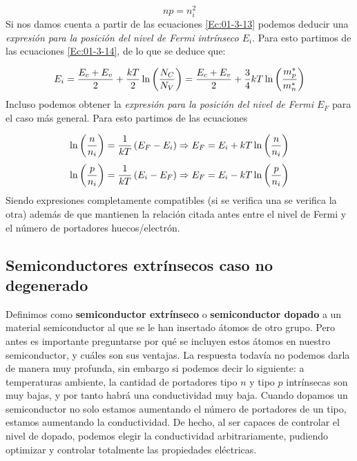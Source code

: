\begin{equation}
	np=n_i^2
\end{equation}
Si nos damos cuenta a partir de las ecuaciones \ref{Ec:01-3-13} podemos deducir una \textit{expresión para la posición del nivel de Fermi intrínseco $E_i$}. Para esto partimos de las ecuaciones \ref{Ec:01-3-14}, de lo que se deduce que:

\begin{equation}
	E_i = \frac{E_c+E_v}{2} + \frac{kT}{2} \ln \left( \frac{N_C}{N_V} \right) = \frac{E_c+E_v}{2} + \frac{3}{4} kT \ln \left( \frac{m_p^*}{m_n^*} \right)
\end{equation}
Incluso podemos obtener la \textit{expresión para la posición del nivel de Fermi $E_F$} para el caso más general. Para esto partimos de las ecuaciones

\begin{equation}
	\ln \left( \frac{n}{n_i} \right) = \frac{1}{kT} \left( E_F-E_i \right) \Rightarrow E_F = E_i + kT \ln \left( \frac{n}{n_i} \right)
\end{equation}
\begin{equation}
	\ln \left( \frac{p}{n_i} \right) = \frac{1}{kT} \left( E_i-E_F \right) \Rightarrow E_F = E_i - kT \ln \left( \frac{p}{n_i} \right)
\end{equation}
Siendo expresiones completamente compatibles (si se verifica una se verifica la otra) además de que mantienen la relación citada antes entre el nivel de Fermi y el número de portadores huecos/electrón.

\subsection{Semiconductores extrínsecos caso no degenerado}

Definimos como \textbf{semiconductor extrínseco} o \textbf{semiconductor dopado} a un material semiconductor al que se le han insertado átomos de otro grupo. Pero antes es importante preguntarse por qué se incluyen estos átomos en nuestro semiconductor, y cuáles son sus ventajas. La respuesta todavía no podemos darla de manera muy profunda, sin embargo si podemos decir lo siguiente: a temperaturas ambiente, la cantidad de portadores tipo $n$ y tipo $p$ intrínsecas son muy bajas, y por tanto habrá una conductividad muy baja. Cuando dopamos un semiconductor no solo estamos aumentando el número de portadores de un tipo, estamos aumentando la conductividad. De hecho, al ser capaces de controlar el nivel de dopado, podemos elegir la conductividad arbitrariamente, pudiendo optimizar y controlar totalmente las propiedades eléctricas.

